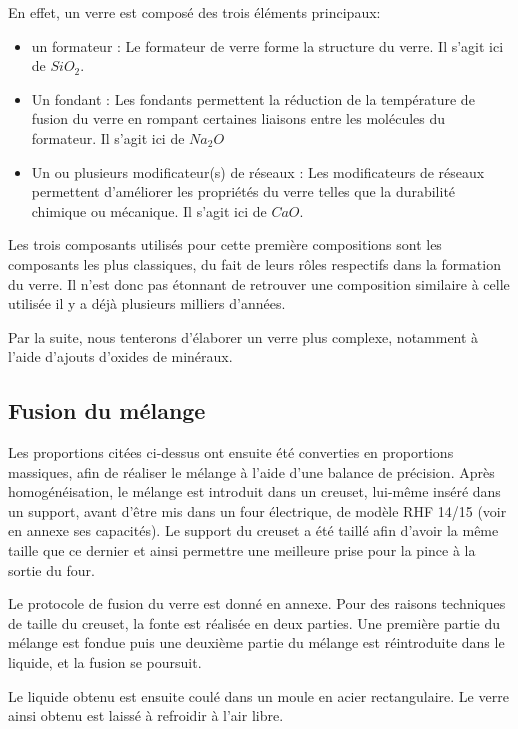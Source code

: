 \documentclass{article}
\begin{document}
En effet, un verre est composé des trois éléments principaux:

\begin{itemize}
    \item un formateur : Le formateur de verre forme la structure du verre. Il s'agit ici de $SiO_2$.
    \item Un fondant : Les fondants permettent la réduction de la température de fusion du verre en rompant certaines liaisons entre les molécules du formateur. Il s'agit ici de $Na_2O$
    \item Un ou plusieurs modificateur(s) de réseaux : Les modificateurs de réseaux permettent d'améliorer les propriétés du verre telles que la durabilité chimique ou mécanique. Il s'agit ici de $CaO$.
\end{itemize}

Les trois composants utilisés pour cette première compositions sont les composants les plus classiques, du fait de leurs rôles respectifs dans la formation du verre. Il n'est donc pas étonnant de retrouver une composition similaire à celle utilisée il y a déjà plusieurs milliers d'années. 

Par la suite, nous tenterons d'élaborer un verre plus complexe, notamment à l'aide d'ajouts d'oxides de minéraux.

\subsection{Fusion du mélange}

Les proportions citées ci-dessus ont ensuite été converties en proportions massiques, afin de réaliser le mélange à l'aide d'une balance de précision. Après homogénéisation, le mélange est introduit dans un creuset, lui-même inséré dans un support, avant d'être mis dans un four électrique, de modèle RHF 14/15 (voir en annexe ses capacités). Le support du creuset a été taillé afin d'avoir la même taille que ce dernier et ainsi permettre une meilleure prise pour la pince à la sortie du four.

Le protocole de fusion du verre est donné en annexe. Pour des raisons techniques de taille du creuset, la fonte est réalisée en deux parties. Une première partie du mélange est fondue puis une deuxième partie du mélange est réintroduite dans le liquide, et la fusion se poursuit.

Le liquide obtenu est ensuite coulé dans un moule en acier rectangulaire. Le verre ainsi obtenu est laissé à refroidir à l'air libre.
\end{document}
